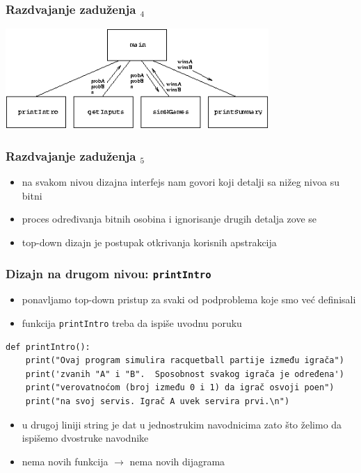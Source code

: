 \documentclass[utf8,compress]{beamer}
\begin{document}
\begin{frame}
  \frametitle{Razdvajanje zaduženja $_4$}
  \begin{center}
    \includegraphics[width=10cm]{pic22}
  \end{center}
\end{frame}

\begin{frame}
  \frametitle{Razdvajanje zaduženja $_5$}
  \begin{itemize}
    \item na svakom nivou dizajna interfejs nam govori koji detalji sa nižeg nivoa su bitni
    \item proces određivanja bitnih osobina i ignorisanje drugih detalja zove se 
    \item top-down dizajn je postupak otkrivanja korisnih apstrakcija
  \end{itemize}
\end{frame}

\begin{frame}[fragile,shrink=15]
  \frametitle{Dizajn na drugom nivou: \texttt{printIntro}}
  \begin{itemize}
    \item ponavljamo top-down pristup za svaki od podproblema koje smo već definisali
    \item funkcija \texttt{printIntro} treba da ispiše uvodnu poruku
  \end{itemize}
\begin{verbatim}
def printIntro():
    print("Ovaj program simulira racquetball partije između igrača")
    print('zvanih "A" i "B".  Sposobnost svakog igrača je određena')
    print("verovatnoćom (broj između 0 i 1) da igrač osvoji poen")
    print("na svoj servis. Igrač A uvek servira prvi.\n")
\end{verbatim}
  \begin{itemize}
    \item u drugoj liniji string je dat u jednostrukim navodnicima zato što želimo da ispišemo dvostruke navodnike
    \item nema novih funkcija $\rightarrow$ nema novih dijagrama
  \end{itemize}
\end{frame}
\end{document}
